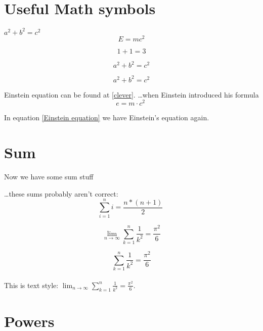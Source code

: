 \documentclass{article}
\begin{document}
\section{Useful Math symbols}

$a^2 + b^2 = c^2$
\begin{equation}
   E = mc^2 \label{clever}
 \end{equation}

\begin{equation}
  1 + 1 = 3 
 \end{equation}

\begin{equation}
  a^2 + b^2 = c^2
 \end{equation}

\begin{equation*}
  a^2 + b^2 = c^2
 \end{equation*}

Einstein equation can be found at \eqref{clever}.
\newline
\newline
\ldots when Einstein introduced his formula
\begin{equation}
e = m \cdot c^2 \;
\label{Einstein equation}
\end{equation}

In equation \eqref{Einstein equation} we have Einstein's equation again.

\section{Sum}
Now we have some sum stuff

\ldots these sums probably aren't correct:
\begin{equation}
\sum_{i=1}^{n} i = \frac{n * (n + 1)}{2}\;
\label{sum}
\end{equation}

\begin{equation}
  \lim_{n \to \infty}
  \sum_{k=1}^n \frac{1}{k^2}
  = \frac{\pi^2}{6}
 \end{equation}

\begin{equation}
  \sum_{k=1}^n \frac{1}{k^2}
  = \frac{\pi^2}{6}
 \end{equation}
\\
This is text style:
$\lim_{n \to \infty}
 \sum_{k=1}^n \frac{1}{k^2}
 = \frac{\pi^2}{6}$.

\section{Powers}
\end{document}
